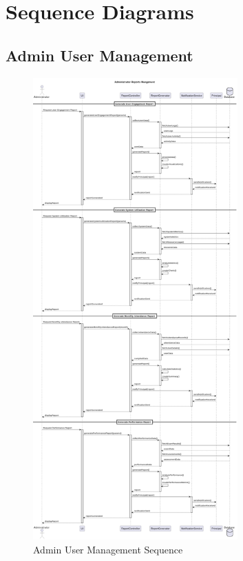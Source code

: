 \documentclass[12pt,a4paper]{report}
\begin{document}
\chapter{Sequence Diagrams}
\section{Admin User Management}
\begin{figure}[htbp]
    \centering
    \includegraphics[width=0.7\textwidth]{admin-user-management-sequence.png}
    \caption{Admin User Management Sequence}
    \label{fig:admin-user-management-sequence}
\end{figure}

\newpage
\end{document}
